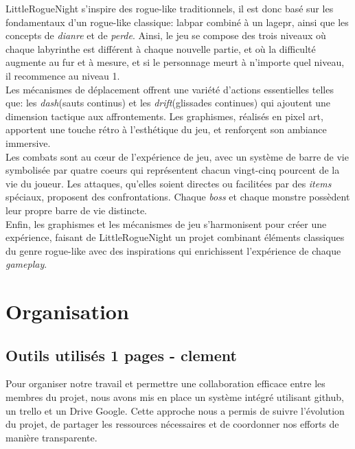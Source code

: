 \documentclass[10pt]{article}
\begin{document}
LittleRogueNight s'inspire des rogue-like traditionnels, il est donc basé sur les fondamentaux d'un rogue-like classique: \gls{labpar} combiné à un
\gls{lagepr}, ainsi que les concepts de \textit{\gls{dianre}} et de \textit{\gls{perde}}. 
Ainsi, le jeu se compose des trois niveaux où chaque labyrinthe est différent à chaque nouvelle partie, 
et où la difficulté augmente au fur et à mesure, et si le personnage meurt à n'importe quel niveau, il recommence au niveau 1.\\

Les mécanismes de déplacement offrent une variété d'actions essentielles telles que: les \textit{\gls{dash}}(sauts continus) et 
les \textit{\gls{drift}}(glissades continues) qui ajoutent une dimension tactique aux affrontements. Les graphismes, réalisés en pixel art, apportent une touche rétro à 
l'esthétique du jeu, et renforçent son ambiance immersive.\\

Les combats sont au cœur de l'expérience de jeu, avec un système de barre de vie symbolisée par quatre coeurs qui représentent chacun vingt-cinq pourcent 
de la vie du joueur. Les attaques, qu'elles soient directes ou facilitées par des \textit{\gls{items}} 
spéciaux, proposent des confrontations. Chaque \textit{\gls{boss}} et chaque monstre 
possèdent leur propre barre de vie distincte.\\

Enfin, les graphismes et les mécanismes de jeu s'harmonisent pour créer une expérience, faisant de LittleRogueNight un projet 
combinant éléments classiques du genre rogue-like avec des inspirations qui enrichissent l'expérience de chaque \textit{gameplay}.


\section{Organisation}   
\subsection{Outils utilisés 1 pages - clement}
Pour organiser notre travail et permettre une collaboration efficace entre les membres du projet, nous avons mis en place un système intégré utilisant \gls{github}, un \gls{trello} et un Drive Google. Cette approche nous a permis de suivre l'évolution du projet, de partager les ressources nécessaires et de coordonner nos efforts de manière transparente.
\end{document}
